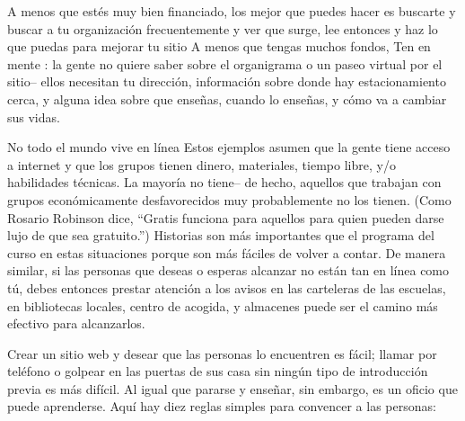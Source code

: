 A menos que estés muy bien financiado,
los mejor que puedes hacer es buscarte y buscar a tu organización frecuentemente
y ver que surge,
lee entonces 
y haz lo que puedas para mejorar tu sitio
A menos que tengas muchos fondos,
Ten en mente :
la gente no quiere saber sobre el organigrama o un paseo virtual por el sitio-- ellos necesitan tu dirección,
información sobre donde hay estacionamiento cerca, 
y alguna idea sobre que enseñas,
cuando lo enseñas,
y cómo va a cambiar sus vidas.


\begin{aside}{No todo el mundo vive en línea}
Estos ejemplos asumen que la gente tiene acceso a internet 
y que los grupos tienen dinero, materiales, tiempo libre, y/o  habilidades técnicas.
La mayoría no tiene-- de hecho,
aquellos que trabajan con grupos económicamente desfavorecidos muy probablemente no los tienen.
 (Como Rosario Robinson dice, ``Gratis funciona para aquellos para quien pueden darse lujo de que sea gratuito.'')
Historias son más importantes que el programa del curso en estas situaciones
porque son más fáciles de volver a contar.
 De manera similar,
si las personas que deseas o esperas alcanzar no están tan en línea como tú,
debes entonces prestar atención a los avisos en las carteleras de las escuelas,
en bibliotecas locales,
centro de acogida,
y almacenes puede ser el camino más efectivo para alcanzarlos.

\end{aside}


Crear un sitio web y desear que las personas lo encuentren es fácil;
llamar por teléfono o golpear en las puertas de sus casa sin ningún tipo de introducción previa
es más difícil.
Al igual que pararse y enseñar,
sin embargo, es un oficio que puede aprenderse.
 Aquí hay diez reglas simples para convencer a las personas:


